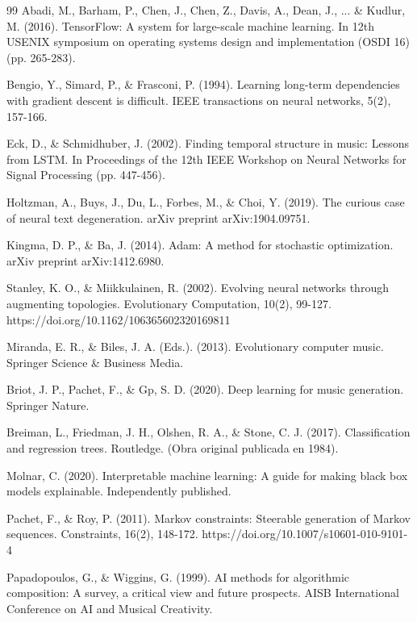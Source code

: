 \documentclass[12pt]{report}
\begin{document}
\begin{thebibliography}{99}
 Abadi, M., Barham, P., Chen, J., Chen, Z., Davis, A., Dean, J., ... \& Kudlur, M. (2016). TensorFlow: A system for large-scale machine learning. In 12th USENIX symposium on operating systems design and implementation (OSDI 16) (pp. 265-283).

 Bengio, Y., Simard, P., \& Frasconi, P. (1994). Learning long-term dependencies with gradient descent is difficult. IEEE transactions on neural networks, 5(2), 157-166.

 Eck, D., \& Schmidhuber, J. (2002). Finding temporal structure in music: Lessons from LSTM. In Proceedings of the 12th IEEE Workshop on Neural Networks for Signal Processing (pp. 447-456).

 Holtzman, A., Buys, J., Du, L., Forbes, M., \& Choi, Y. (2019). The curious case of neural text degeneration. arXiv preprint arXiv:1904.09751.

 Kingma, D. P., \& Ba, J. (2014). Adam: A method for stochastic optimization. arXiv preprint arXiv:1412.6980.

 Stanley, K. O., \& Miikkulainen, R. (2002). Evolving neural networks through augmenting topologies. Evolutionary Computation, 10(2), 99-127. https://doi.org/10.1162/106365602320169811

 Miranda, E. R., \& Biles, J. A. (Eds.). (2013). Evolutionary computer music. Springer Science \& Business Media.

 Briot, J. P., Pachet, F., \& Gp, S. D. (2020). Deep learning for music generation. Springer Nature.

 Breiman, L., Friedman, J. H., Olshen, R. A., \& Stone, C. J. (2017). Classification and regression trees. Routledge. (Obra original publicada en 1984).

 Molnar, C. (2020). Interpretable machine learning: A guide for making black box models explainable. Independently published.

 Pachet, F., \& Roy, P. (2011). Markov constraints: Steerable generation of Markov sequences. Constraints, 16(2), 148-172. https://doi.org/10.1007/s10601-010-9101-4

 Papadopoulos, G., \& Wiggins, G. (1999). AI methods for algorithmic composition: A survey, a critical view and future prospects. AISB International Conference on AI and Musical Creativity.


\end{thebibliography}
\end{document}
